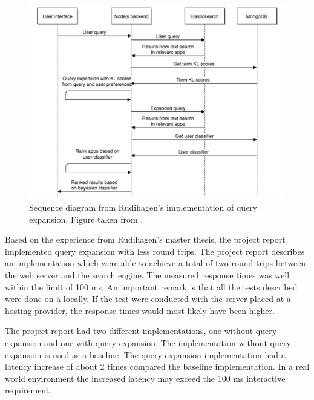 \begin{figure}[h!]
  \centering \includegraphics[width=1\linewidth]{img/sequence-diagram-rudihagen.png}
  \caption{Sequence diagram from Rudihagen's implementation of query expansion. Figure taken from \cite{master-thesis}.}
  \label{fig:sequence-diagram-rudihagen}
\end{figure}

Based on the experience from Rudihagen's master thesis,
the project report \cite{project-report} implemented query expansion with less round trips.
The project report describes an implementation which were able to achieve a total of two round trips between the web server and the search engine.
The measured response times was well within the limit of 100 ms.
An important remark is that all the tests described were done on a locally.
If the test were conducted with the server placed at a hosting provider,
the response times would most likely have been higher.

The project report had two different implementations, one without query expansion and one with query expansion.
The implementation without query expansion is used as a baseline.
The query expansion implementation had a latency increase of about 2 times compared the baseline implementation.
In a real world environment the increased latency may exceed the 100 ms interactive requirement.


